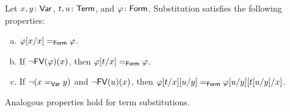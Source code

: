 \begin{prop}\label{prop:substitution-properties}
    Let\/ $x,y\colon\fun{Var}$, $t,u\colon\fun{Term}$, and\/ $\varphi\colon\fun{Form}$. Substitution satisfies the following properties:
    \begin{enumerate}[a),font=\upshape]
        \item $\varphi[x/x]\mathrel{=_{\mathsf{Form}}}\varphi$.
        
        \item If\/ $\neg\mathsf{FV}(\varphi)(x)$, then\/ $\varphi[t/x]\mathrel{=_{\mathsf{Form}}}\varphi$.
        
        \item If\/ $\neg(x\mathrel{=_{\mathsf{Var}}}y)$ and\/ $\neg\mathsf{FV}(u)(x)$, then\/ $\varphi[t/x][u/y]\mathrel{=_{\mathsf{Form}}}\varphi[u/y][t[u/y]/x]$.
    \end{enumerate}
    Analogous properties hold for term substitutions.
\end{prop}

